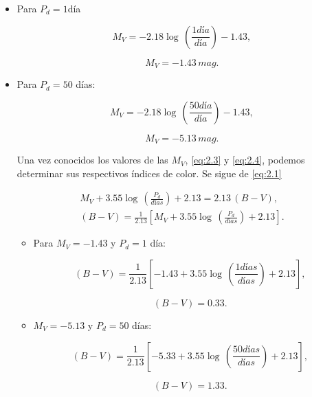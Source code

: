 \documentclass[paper=a4, fontsize=10pt]{scrartcl} %
\begin{document}
\begin{itemize} 

\item Para $P_d = 1$día

\begin{equation*}
M_V = -2.18 \log \, \left(\frac{1 día}{día} \right) -1.43,
\end{equation*}

\begin{equation} \label{eq:2.3} 
M_V =  -1.43 \,mag.
\end{equation}

\item Para $P_d=50$ días:

\begin{equation*}
M_V = -2.18 \log \, \left(\frac{50 día}{día} \right) -1.43,
\end{equation*}

\begin{equation} \label{eq:2.4} 
M_V =  -5.13 \, mag.
\end{equation}

Una vez conocidos los valores de las $M_V$, \eqref{eq:2.3} y \eqref{eq:2.4}, podemos determinar sus respectivos índices de color. Se sigue de \eqref{eq:2.1}

\begin{align*}
M_V + 3.55 \log \, \left(\frac{P_d}{días} \right) + 2.13= 2.13 \, (B-V), \\
(B-V) = \frac{1}{2.13} \left[ M_V +3.55 \log \, \left(\frac{P_d}{días} \right) +2.13 \right].
\end{align*}

\begin{itemize}

\item Para $M_V = -1.43$ y $P_d = 1$ día: 

\begin{equation*}
(B-V) = \frac{1}{2.13} \left[ -1.43 +3.55 \log \, \left(\frac{1 días}{días} \right) +2.13 \right], 
\end{equation*}

\begin{equation} \label{eq:2.5}
(B-V) = 0.33. 
\end{equation}


\item $M_V=-5.13$ y $P_d= 50$ días: 

\begin{equation*}
(B-V) = \frac{1}{2.13} \left[ -5.33 +3.55 \log \, \left(\frac{50 días}{días} \right) +2.13 \right], 
\end{equation*}


\begin{equation} \label{eq:2.6}
(B-V) = 1.33.
\end{equation}

\end{itemize}




\end{itemize}
\end{document}
